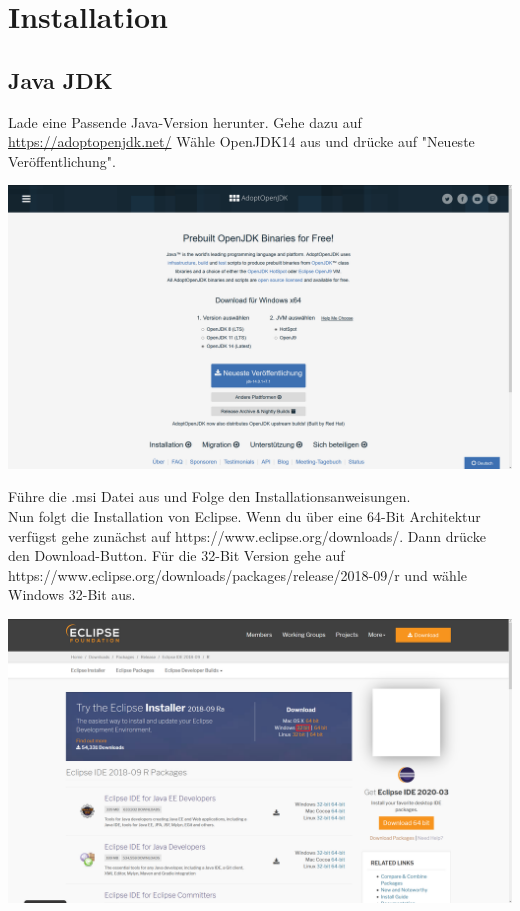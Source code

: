 \documentclass{scrartcl}
\begin{document}
\section{Installation}
\subsection{Java JDK}
Lade eine Passende Java-Version herunter. Gehe dazu auf \url{https://adoptopenjdk.net/} Wähle OpenJDK14
aus und drücke auf "Neueste Veröffentlichung".\\
\begin{center}
    \includegraphics[width=.88\textwidth]{Screenshot_6.png}
\end{center}
Führe die .msi Datei aus und Folge den Installationsanweisungen.\\
Nun folgt die Installation von Eclipse.
Wenn du über eine 64-Bit Architektur verfügst gehe zunächst auf https://www.eclipse.org/downloads/. Dann drücke den Download-Button.
Für die 32-Bit Version gehe auf https://www.eclipse.org/downloads/packages/release/2018-09/r und wähle Windows 32-Bit aus.\\

\begin{center}
    \includegraphics[width=.88\textwidth]{Screenshot_2.3.png}
\end{center}
\end{document}
